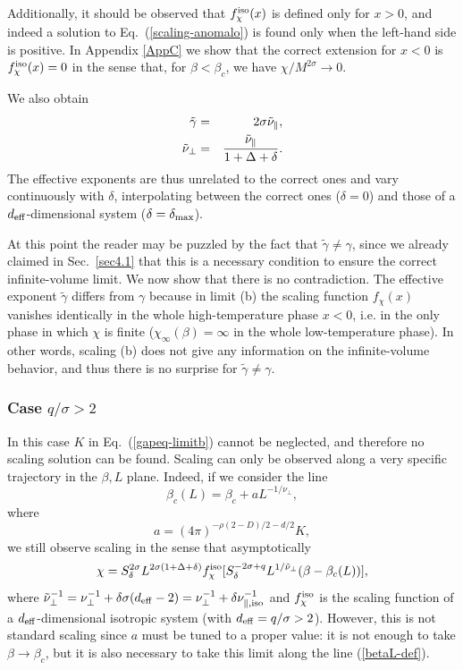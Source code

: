 \documentclass[a4paper,12pt]{article}
\begin{document}
Additionally, it should be observed that $f_\chi^{\rm iso}(x)$ is defined 
only for $x>0$, and indeed a solution to Eq.~(\ref{scaling-anomalo})
is found only when the left-hand side is positive. 
In Appendix \ref{AppC} we show that the correct extension for $x < 0$  
is $f_\chi^{\rm iso}(x) = 0$ in the sense that, for $\beta < \beta_c$, we have 
$\chi/M^{2\sigma}\to 0$.

We also obtain 
\begin{eqnarray}
\tilde{\gamma} &=& 2 \sigma \tilde{\nu}_\|, \nonumber \\
\tilde{\nu}_\bot &=& {\tilde{\nu}_\|\over 1+\Delta+\delta}.
\end{eqnarray}
The effective exponents are thus unrelated to the correct ones
and vary continuously with $\delta$, interpolating between the 
correct ones ($\delta = 0$) and those of a $d_{\rm eff}$-dimensional
system ($\delta = \delta_{\rm max}$).

At this point the reader may be puzzled by the fact that 
$\tilde\gamma\not=\gamma$, since we already claimed in Sec.~\ref{sec4.1}
that this is a necessary condition to ensure the correct infinite-volume
limit. We now show that there is no contradiction. The effective 
exponent $\tilde\gamma$ differs from $\gamma$ because in limit (b) 
the scaling function $f_\chi(x)$ vanishes identically in the whole 
high-temperature phase $x<0$, i.e. in the only phase in
which $\chi$ is finite ($\chi_\infty(\beta) = \infty$ in the whole 
low-temperature phase). In other words, scaling (b) does not give any
information on the infinite-volume behavior, and thus there is no
surprise for $\tilde\gamma\not=\gamma$.


\subsubsection{Case $q/\sigma>2$} \label{sec4.2.2}

In this case $K$ in Eq.~(\ref{gapeq-limitb}) cannot be neglected,
and therefore no scaling solution can be found. 
Scaling can only be observed along a very specific trajectory 
in the $\beta,L$ plane. Indeed, if we consider the line
\begin{equation}
    \beta_c(L) = \beta_c + a L^{-1/\nu_\bot} ,
\label{betaL-def}
\end{equation}
where 
\begin{equation} 
    a = (4\pi)^{-\rho(2-D)/2-d/2} K ,
\end{equation}
we still observe scaling in the sense that asymptotically
\begin{equation}
\chi = S_\delta^{2\sigma} L^{2\sigma(1+\Delta+\delta)} f_\chi^{{\rm iso}}
   [S_\delta^{-2\sigma +q} L^{1/\tilde{\nu}_\bot}(\beta-\beta_c(L))],
\end{equation}
where $\tilde{\nu}_\bot^{-1} = \nu_\bot^{-1} + 
\delta \sigma (d_{\rm eff} -2) = \nu_\bot^{-1} + \delta\nu_{\|,\rm iso}^{-1}$ 
and $f_\chi^{{\rm iso}}$ is the scaling 
function of a $d_{\rm eff}$-dimensional isotropic system (with
$d_{\rm eff}=q/\sigma>2$).
However, this is not standard scaling since $a$ must be tuned to a proper
value: it is not enough to take $\beta\to\beta_c$, but it is also
necessary to take this limit along the line (\ref{betaL-def}).
\end{document}
